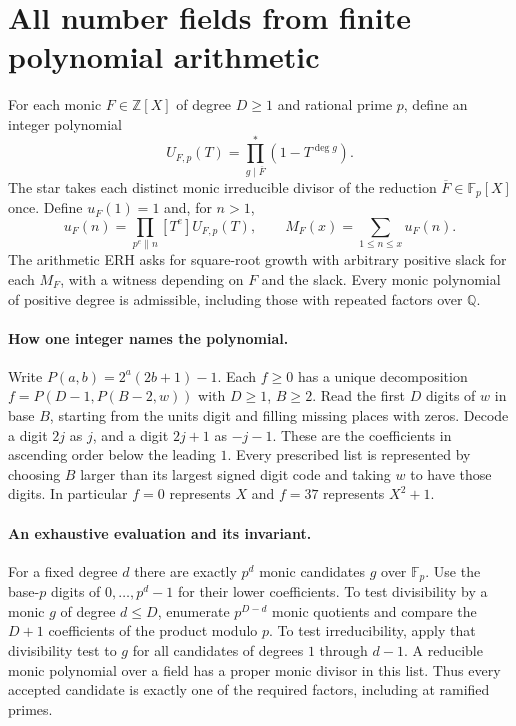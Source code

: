 \section{All number fields from finite polynomial arithmetic}
\label{sec:dedekind}

For each monic $F\in\mathbb Z[X]$ of degree $D\ge1$ and rational prime $p$,
define an integer polynomial
\[
 U_{F,p}(T)=\prod_{g\mid\overline F}^{*}(1-T^{\deg g}).
\]
The star takes each distinct monic irreducible divisor of the reduction
$\overline F\in\mathbb F_p[X]$ once. Define $u_F(1)=1$ and, for $n>1$,
\[
 u_F(n)=\prod_{p^e\parallel n}[T^e]U_{F,p}(T),\qquad
 M_F(x)=\sum_{1\le n\le x}u_F(n).
\]
The arithmetic ERH asks for square-root growth with arbitrary positive
slack for each $M_F$, with a witness depending on $F$ and the slack.
Every monic polynomial of positive degree is admissible, including those
with repeated factors over $\mathbb Q$.

\paragraph{How one integer names the polynomial.}
Write $P(a,b)=2^a(2b+1)-1$. Each $f\ge0$ has a unique decomposition
$f=P(D-1,P(B-2,w))$ with $D\ge1$, $B\ge2$. Read the first $D$ digits
of $w$ in base $B$, starting from the units digit and filling missing
places with zeros. Decode a digit $2j$ as $j$, and a digit $2j+1$ as
$-j-1$. These are the coefficients in ascending order below the
leading $1$. Every prescribed list is represented by choosing $B$ larger
than its largest signed digit code and taking $w$ to have those digits.
In particular $f=0$ represents $X$ and $f=37$ represents $X^2+1$.

\paragraph{An exhaustive evaluation and its invariant.}
For a fixed degree $d$ there are exactly $p^d$ monic candidates $g$
over $\mathbb F_p$. Use the base-$p$ digits of $0,\ldots,p^d-1$ for their
lower coefficients. To test divisibility by a monic $g$ of degree
$d\le D$, enumerate $p^{D-d}$ monic quotients and compare the $D+1$
coefficients of the product modulo $p$. To test irreducibility, apply
that divisibility test to $g$ for all candidates of degrees $1$ through
$d-1$. A reducible monic polynomial over a field has a proper monic
divisor in this list. Thus every accepted candidate is exactly one of
the required factors, including at ramified primes.

